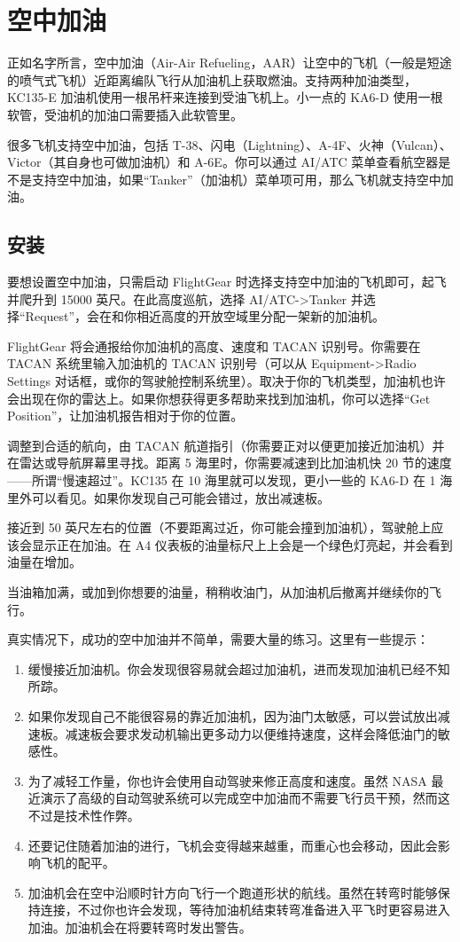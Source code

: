 \section{空中加油}\label{aar}

正如名字所言，空中加油（Air-Air Refueling，AAR）让空中的飞机（一般是短途的喷气式飞机）近距离编队飞行从加油机上获取燃油。支持两种加油类型，KC135-E 加油机使用一根吊杆来连接到受油飞机上。小一点的 KA6-D 使用一根软管，受油机的加油口需要插入此软管里。

很多飞机支持空中加油，包括 T-38、闪电（Lightning）、A-4F、火神（Vulcan）、Victor（其自身也可做加油机）和 A-6E。你可以通过 AI/ATC 菜单查看航空器是不是支持空中加油，如果“Tanker”（加油机）菜单项可用，那么飞机就支持空中加油。

\subsection{安装}

要想设置空中加油，只需启动 FlightGear 时选择支持空中加油的飞机即可，起飞并爬升到 15000 英尺。在此高度巡航，选择 AI/ATC->Tanker 并选择“Request”，会在和你相近高度的开放空域里分配一架新的加油机。

FlightGear 将会通报给你加油机的高度、速度和 TACAN 识别号。你需要在 TACAN 系统里输入加油机的 TACAN 识别号（可以从 Equipment->Radio Settings 对话框，或你的驾驶舱控制系统里）。取决于你的飞机类型，加油机也许会出现在你的雷达上。如果你想获得更多帮助来找到加油机，你可以选择“Get Position”，让加油机报告相对于你的位置。

调整到合适的航向，由 TACAN 航道指引（你需要正对以便更加接近加油机）并在雷达或导航屏幕里寻找。距离 5 海里时，你需要减速到比加油机快 20 节的速度——所谓“慢速超过”。KC135 在 10 海里就可以发现，更小一些的 KA6-D 在 1 海里外可以看见。如果你发现自己可能会错过，放出减速板。

接近到 50 英尺左右的位置（不要距离过近，你可能会撞到加油机），驾驶舱上应该会显示正在加油。在 A4 仪表板的油量标尺上上会是一个绿色灯亮起，并会看到油量在增加。

当油箱加满，或加到你想要的油量，稍稍收油门，从加油机后撤离并继续你的飞行。

真实情况下，成功的空中加油并不简单，需要大量的练习。这里有一些提示：

\begin{enumerate}
\item 缓慢接近加油机。你会发现很容易就会超过加油机，进而发现加油机已经不知所踪。
\item 如果你发现自己不能很容易的靠近加油机，因为油门太敏感，可以尝试放出减速板。减速板会要求发动机输出更多动力以便维持速度，这样会降低油门的敏感性。
\item 为了减轻工作量，你也许会使用自动驾驶来修正高度和速度。虽然 NASA 最近演示了高级的自动驾驶系统可以完成空中加油而不需要飞行员干预，然而这不过是技术性作弊。
\item 还要记住随着加油的进行，飞机会变得越来越重，而重心也会移动，因此会影响飞机的配平。
\item 加油机会在空中沿顺时针方向飞行一个跑道形状的航线。虽然在转弯时能够保持连接，不过你也许会发现，等待加油机结束转弯准备进入平飞时更容易进入加油。加油机会在将要转弯时发出警告。
\end{enumerate}

